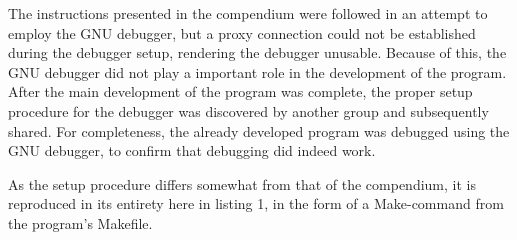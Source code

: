 The instructions presented in the compendium\cite{lab-compendium} were followed in an attempt to employ the GNU debugger, but a proxy connection could not be established during the debugger setup, rendering the debugger unusable.
Because of this, the GNU debugger did not play a important role in the development of the program.
After the main development of the program was complete, the proper setup procedure for the debugger was discovered by another group and subsequently shared.
For completeness, the already developed program was debugged using the GNU debugger, to confirm that debugging did indeed work.

As the setup procedure differs somewhat from that of the compendium, it is reproduced in its entirety here in listing 1, in the form of a Make-command from the program's Makefile.


